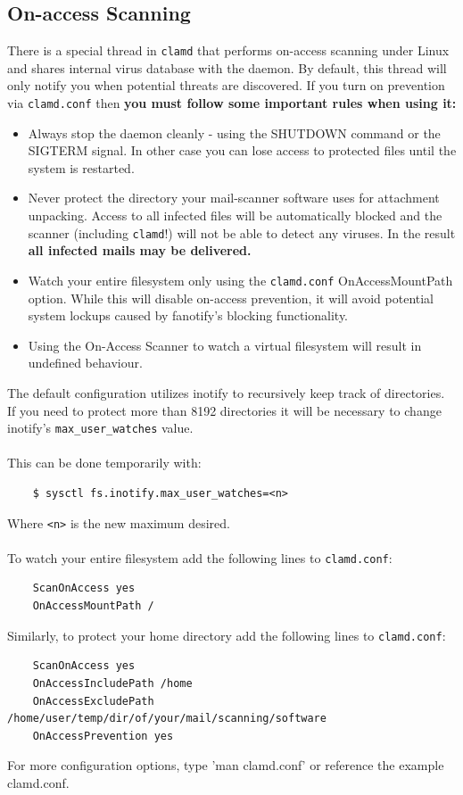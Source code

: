 \documentclass[a4paper,titlepage,12pt]{article}
\begin{document}
    \subsection{On-access Scanning}\label{On-access}
    There is a special thread in \verb+clamd+ that performs on-access
    scanning under Linux and shares internal virus database
    with the daemon. By default, this thread will only notify you when
    potential threats are discovered. If you turn on prevention via
    \verb+clamd.conf+ then \textbf{you must follow some important rules when
    using it:}
    \begin{itemize}
	\item Always stop the daemon cleanly - using the SHUTDOWN command or
	      the\\ SIGTERM signal. In other case you can lose access
	      to protected files until the system is restarted.
	\item Never protect the directory your mail-scanner software
	      uses for attachment unpacking. Access to all infected
	      files will be automatically blocked and the scanner (including
	      \verb+clamd+!) will not be able to detect any viruses. In the
	      result \textbf{all infected mails may be delivered.}
	\item Watch your entire filesystem only using the \verb+clamd.conf+
	      OnAccessMountPath option. While this will disable on-access prevention,
	      it will avoid potential system lockups caused by fanotify's blocking
	      functionality.
	\item Using the On-Access Scanner to watch a virtual filesystem will result
	      in undefined behaviour.
    \end{itemize}
    The default configuration utilizes inotify to recursively keep track of
    directories. If you need to protect more than 8192 directories it will
    be necessary to change inotify's \verb+max_user_watches+ value.
    \\\\
    This can be done temporarily with:
    \begin{verbatim}
    $ sysctl fs.inotify.max_user_watches=<n>
    \end{verbatim}
    Where \verb+<n>+ is the new maximum desired.
    \\\\
    To watch your entire filesystem add the following lines to
    \verb+clamd.conf+:
    \begin{verbatim}
	ScanOnAccess yes
	OnAccessMountPath /
    \end{verbatim}
    Similarly, to protect your home directory add the following lines to
    \verb+clamd.conf+:
    \begin{verbatim}
	ScanOnAccess yes
	OnAccessIncludePath /home
	OnAccessExcludePath /home/user/temp/dir/of/your/mail/scanning/software
	OnAccessPrevention yes
    \end{verbatim}
    For more configuration options, type 'man clamd.conf' or reference the
    example clamd.conf.
\end{document}
